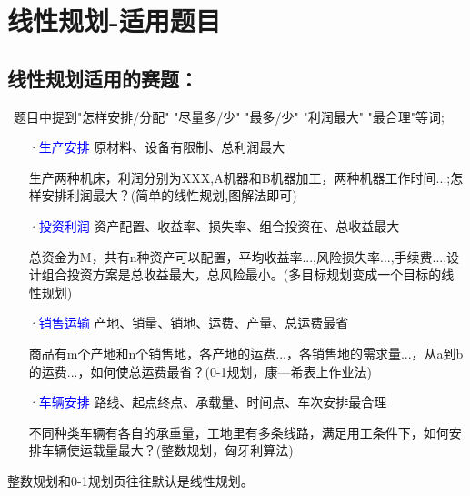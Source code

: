 \documentclass[a4paper,20pt]{article}
\begin{document}
    \section{线性规划-适用题目}

    \subsection{线性规划适用的赛题：}
    ~题目中提到"怎样安排/分配" "尽量多/少" "最多/少" "利润最大" "最合理"等词;
    \begin{itemize}
        \item[·\textcolor{blue}{生产安排}] 原材料、设备有限制、总利润最大 \par 生产两种机床，利润分别为XXX,A机器和B机器加工，两种机器工作时间...;怎样安排利润最大？(简单的线性规划,图解法即可)
        \item[·\textcolor{blue}{投资利润}] 资产配置、收益率、损失率、组合投资在、总收益最大 \par 总资金为M，共有n种资产可以配置，平均收益率...,风险损失率...,手续费...,设计组合投资方案是总收益最大，总风险最小。(多目标规划变成一个目标的线
            性规划)
        \item[·\textcolor{blue}{销售运输}] 产地、销量、销地、运费、产量、总运费最省\par 商品有m个产地和n个销售地，各产地的运费...，各销售地的需求量...，从a到b的运费...，如何使总运费最省？(0-1规划，康—希表上作业法)
        \item[·\textcolor{blue}{车辆安排}] 路线、起点终点、承载量、时间点、车次安排最合理\par 不同种类车辆有各自的承重量，工地里有多条线路，满足用工条件下，如何安排车辆使运载量最大？(整数规划，匈牙利算法)
    \end{itemize}
    整数规划和0-1规划页往往默认是线性规划。
\end{document}
